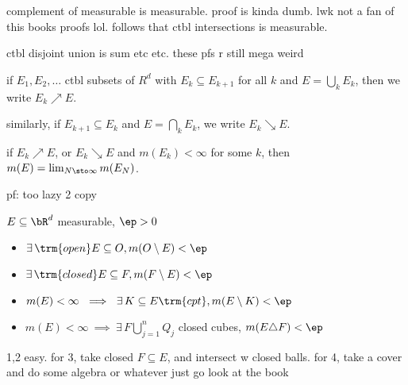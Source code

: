 complement of measurable is measurable. proof is kinda dumb. lwk not a fan of
this books proofs lol. follows that ctbl intersections is measurable.

ctbl disjoint union is sum etc etc. these pfs r still mega weird

\begin{defn}
    if $E_{1},E_{2},\dots$ ctbl subsets of $R^{d}$ with $E_{k}\subseteq E_{k+1}$
    for all $k$ and $E=\bigcup_{k}E_{k}$, then we write $E_{k}\nearrow E$.

    similarly, if $E_{k+1}\subseteq E_{k}$ and $E=\bigcap_{k}E_{k}$, we write
    $E_{k}\searrow E$.
\end{defn}

\begin{prop}
    if $E_{k}\nearrow E$, or $E_{k}\searrow E$ and $m(E_{k})<\infty$ for some
    $k$, then $m(E)=\lim_{N\sto\infty}m(E_{N})$.
\end{prop}

pf: too lazy 2 copy

\begin{prop}
    $E\subseteq\bR^{d}$ measurable, $\ep>0$
    \begin{itemize}
        \item $\exists \, \trm{ open }E\subseteq O, m(O\setminus E)<\ep$
        \item $\exists \, \trm{ closed }E\subseteq F, m(F\setminus E)<\ep$
        \item $m(E)<\infty\ \implies \ \exists \, K\subseteq E \trm{ cpt },
            m(E\setminus K)<\ep$
        \item $m(E)<\infty\ \implies \ \exists \, F\bigcup_{j=1}^{n}Q_{j}$ closed
            cubes, $m(E\triangle F)<\ep$
    \end{itemize}
\end{prop}

\begin{pf}[source=Primary Source Material]
    1,2 easy.
    for 3, take closed $F\subseteq E$, and intersect w closed balls.
    for 4, take a cover and do some algebra or whatever just go look at the book
\end{pf}

